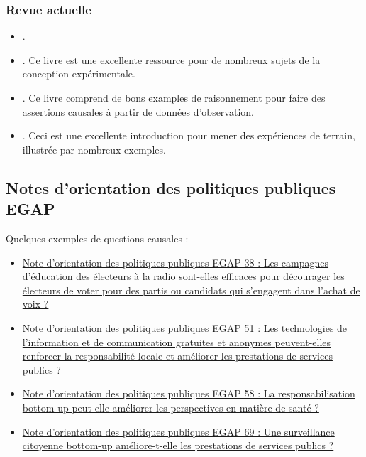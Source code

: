 \documentclass[
  12pt,
]{book}
\begin{document}
\hypertarget{revue-actuelle}{%
\subsubsection{Revue actuelle}\label{revue-actuelle}}

\begin{itemize}
\item
  \autocite{brady2008causation}.
\item
  \autocite[Chapitre 1]{gerber_field_2012}. Ce livre est une excellente ressource pour de nombreux sujets de la conception expérimentale.
\item
  \autocite[Chapitre 1]{morgan_counterfactuals_2007}. Ce livre comprend de bons examples de raisonnement pour faire des assertions causales à partir de données d'observation.
\item
  \autocite{glennerster_running_2013}. Ceci est une excellente introduction pour mener des expériences de terrain, illustrée par nombreux exemples.
\end{itemize}

\hypertarget{notes-dorientation-des-politiques-publiques-egap}{%
\subsection{Notes d'orientation des politiques publiques EGAP}\label{notes-dorientation-des-politiques-publiques-egap}}

Quelques exemples de questions causales :

\begin{itemize}
\item
  \href{https://egap.org/resource/brief-38-diminishing-the-effectiveness-of-vote-buying-through-voter-education/}{Note d'orientation des politiques publiques EGAP 38 : Les campagnes d'éducation des électeurs à la radio sont-elles efficaces pour décourager les électeurs de voter pour des partis ou candidats qui s'engagent dans l'achat de voix ?}
\item
  \href{https://egap.org/resource/does-information-technology-improve-public-service-delivery-lessons-from-uganda/}{Note d'orientation des politiques publiques EGAP 51 : Les technologies de l'information et de communication gratuites et anonymes peuvent-elles renforcer la responsabilité locale et améliorer les prestations de services publics ?}
\item
  \href{https://egap.org/resource/does-bottom-up-accountability-work-evidence-from-uganda/}{Note d'orientation des politiques publiques EGAP 58 : La responsabilisation bottom-up peut-elle améliorer les perspectives en matière de santé ?}
\item
  \href{https://egap.org/resource/brief-69-bottom-up-accountability-and-public-service-provision-in-brazil/}{Note d'orientation des politiques publiques EGAP 69 : Une surveillance citoyenne bottom-up améliore-t-elle les prestations de services publics ?}
\end{itemize}
\end{document}
